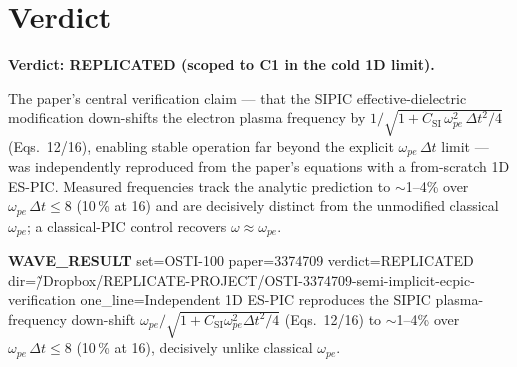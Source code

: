 \documentclass[11pt]{article}
\begin{document}
\section{Verdict}
\textbf{Verdict: REPLICATED (scoped to C1 in the cold 1D limit).}

The paper's central verification claim --- that the SIPIC
effective-dielectric modification down-shifts the electron plasma
frequency by $1/\sqrt{1 + C_{\text{SI}}\,\omega_{pe}^{2}\,\Delta t^{2}/4}$
(Eqs.~12/16), enabling stable operation far beyond the explicit
$\omega_{pe}\,\Delta t$ limit --- was independently reproduced from the
paper's equations with a from-scratch 1D ES-PIC. Measured frequencies
track the analytic prediction to $\sim$1--4\% over
$\omega_{pe}\,\Delta t\le 8$ (10\,\% at 16) and are decisively distinct
from the unmodified classical $\omega_{pe}$; a classical-PIC control
recovers $\omega\approx\omega_{pe}$.

\bigskip
\noindent\textbf{WAVE\_RESULT} set=OSTI-100 paper=3374709
verdict=REPLICATED
dir=\~/Dropbox/REPLICATE-PROJECT/OSTI-3374709-semi-implicit-ecpic-verification
one\_line=Independent 1D ES-PIC reproduces the SIPIC plasma-frequency
down-shift $\omega_{pe}/\sqrt{1+C_{\text{SI}}\omega_{pe}^{2}\Delta t^{2}/4}$
(Eqs.~12/16) to $\sim$1--4\% over $\omega_{pe}\,\Delta t\le 8$
(10\,\% at 16), decisively unlike classical $\omega_{pe}$.
\end{document}
